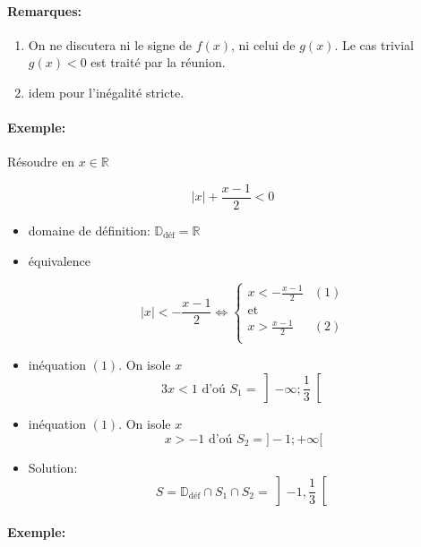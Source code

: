 \documentclass[
    11pt,
    a4paper,
    oneside,
    headinlcude, footinclude,
    twoside,
]{report}
\begin{document}
\paragraph{Remarques:}

\begin{enumerate}
    \item On ne discutera ni le signe de $f(x)$, ni celui de $g(x)$. Le cas
        trivial $g(x) < 0$ est trait\'e par la r\'eunion.
    \item idem pour l'in\'egalit\'e stricte. 
\end{enumerate}

\paragraph{Exemple:}

R\'esoudre en $x \in \mathbb{R}$

$$|x| + \frac{x-1}{2} < 0$$

\begin{itemize}
    \item domaine de d\'efinition: $\mathbb{D}_{\text{d\'ef}} = \mathbb{R}$

    \item \'equivalence 

        $$|x| < - \frac{x-1}{2} \iff \left\{
            \begin{array}{lc}
            x < - \frac{x-1}{2} & (1) \\
            \text{et } \\
            x > \frac{x-1}{2} & (2) \\
            \end{array}
        \right.$$

    \item in\'equation $(1)$. On isole $x$ 
        $$3 x < 1 \text{ d'o\'u } S_{1} = \left]-\infty; \frac{1}{3} \right[$$
    \item in\'equation $(1)$. On isole $x$ 
        $$ x > -1 \text{ d'o\'u } S_{2} = ]-1; + \infty[$$

    \item Solution:
        $$S = \mathbb{D}_{\text{d\'ef}} \cap S_{1} \cap S_{2} = \left]-1, \frac{1}{3}\right[$$
\end{itemize}

\paragraph{Exemple:}
\end{document}
